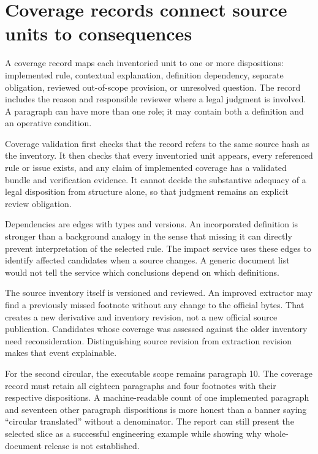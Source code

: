 \documentclass[12pt,a4paper,oneside,openany]{book}
\begin{document}
\section{Coverage records connect source units to consequences}

A coverage record maps each inventoried unit to one or more dispositions:
implemented rule, contextual explanation, definition dependency, separate
obligation, reviewed out-of-scope provision, or unresolved question. The record
includes the reason and responsible reviewer where a legal judgment is involved.
A paragraph can have more than one role; it may contain both a definition and an
operative condition.

Coverage validation first checks that the record refers to the same source hash
as the inventory. It then checks that every inventoried unit appears, every
referenced rule or issue exists, and any claim of implemented coverage has a
validated bundle and verification evidence. It cannot decide the substantive
adequacy of a legal disposition from structure alone, so that judgment remains
an explicit review obligation.

Dependencies are edges with types and versions. An incorporated definition is
stronger than a background analogy in the sense that missing it can directly
prevent interpretation of the selected rule. The impact service uses these edges
to identify affected candidates when a source changes. A generic document list
would not tell the service which conclusions depend on which definitions.

The source inventory itself is versioned and reviewed. An improved extractor may
find a previously missed footnote without any change to the official bytes. That
creates a new derivative and inventory revision, not a new official source
publication. Candidates whose coverage was assessed against the older inventory
need reconsideration. Distinguishing source revision from extraction revision
makes that event explainable.

For the second circular, the executable scope remains paragraph 10. The coverage
record must retain all eighteen paragraphs and four footnotes with their
respective dispositions. A machine-readable count of one implemented paragraph
and seventeen other paragraph dispositions is more honest than a banner saying
``circular translated'' without a denominator. The report can still present the
selected slice as a successful engineering example while showing why whole-
document release is not established.
\end{document}
